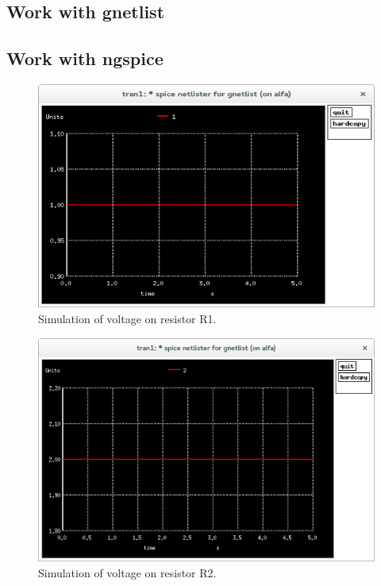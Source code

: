 \documentclass{report}
\begin{document}
\newpage
\subsection{Work with gnetlist}

\newpage

\subsection{Work with ngspice}

\begin{figure}[!ht]
\centering
\includegraphics[width=.9\linewidth]{ngspice_1}
\caption{Simulation of voltage on resistor R1.}
\label{i:example2}
\end{figure}
\vspace*{\floatsep}
\begin{figure}[!hb]
\centering
\includegraphics[width=.9\linewidth]{ngspice_2}
\caption{Simulation of voltage on resistor R2.}
\label{i:ngspice}
\end{figure}
\end{document}
